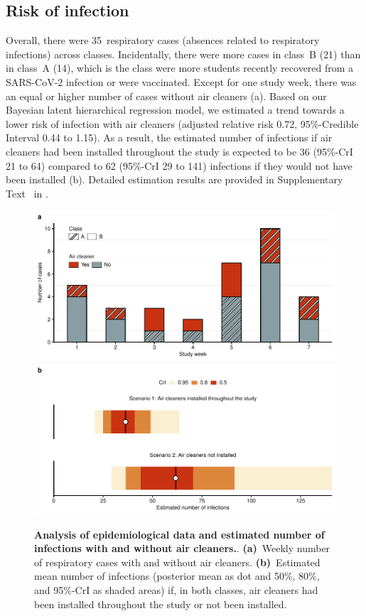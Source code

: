 \documentclass[fleqn,11pt]{wlscirep}
\begin{document}
\subsection{Risk of infection}

Overall, there were 35~respiratory cases (absences related to respiratory infections) across classes. Incidentally, there were more cases in class~B (21) than in class~A (14), which is the class were more students recently recovered from a SARS-CoV-2 infection or were vaccinated. Except for one study week, there was an equal or higher number of cases without air cleaners (a). Based on our Bayesian latent hierarchical regression model, we estimated a trend towards a lower risk of infection with air cleaners (adjusted relative risk 0.72, 95\%-Credible Interval 0.44 to 1.15). As a result, the estimated number of infections if air cleaners had been installed throughout the study is expected to be 36 (95\%-CrI 21 to 64) compared to 62 (95\%-CrI 29 to 141) infections if they would not have been installed (b). Detailed estimation results are provided in Supplementary Text~ in \supp. 

\begin{figure}[!htpb]
    \includegraphics[width=\linewidth]{../../results/epi-data/cases_by_week.pdf} 
    \includegraphics[width=\linewidth]{../../results/epi-data/avoided-infections.pdf}
    \caption{\textbf{Analysis of epidemiological data and estimated number of infections with and without air cleaners.}. \textbf{(a)}~Weekly number of respiratory cases with and without air cleaners. \textbf{(b)}~Estimated mean number of infections (posterior mean as dot and 50\%, 80\%, and 95\%-CrI as shaded areas) if, in both classes, air cleaners had been installed throughout the study or not been installed.}
    \label{fig:redcap-results}
\end{figure}
\end{document}
